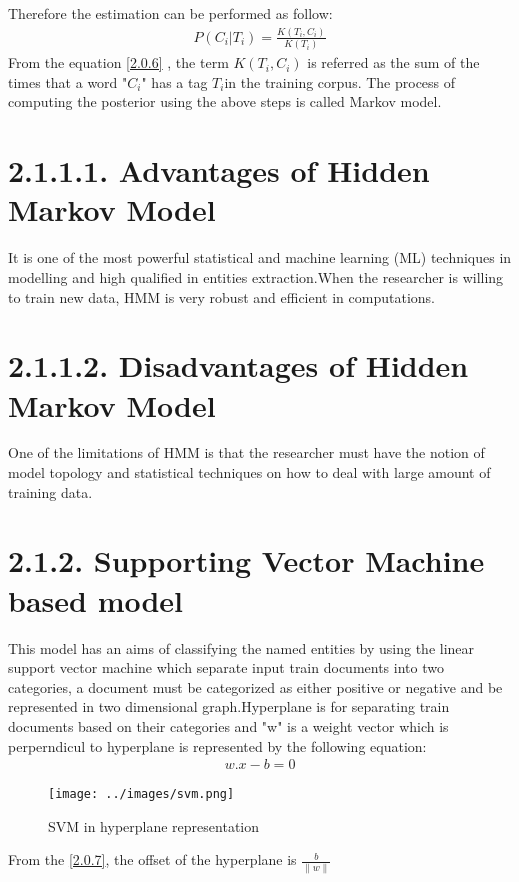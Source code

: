 Therefore the estimation can be performed as follow:
\begin{align}
P(C_{i}|T_{i}) =  \frac{K(T_{i},C_{i})}{K(T_{i})} \label{2.0.6}
\end{align}
From the equation \eqref{2.0.6} , the term $K(T_{i},C_{i})$  is referred as the sum of the times that a word "$C_{i}$" has a tag $T_{i}$in the training corpus.
The process of computing the posterior using the above steps is called Markov model.
\section*{2.1.1.1. Advantages of Hidden Markov Model}
It is one of the most powerful statistical and machine learning (ML) techniques in modelling and high qualified in entities extraction.When the researcher is willing to train new data, HMM is very robust and efficient in computations.
\section*{2.1.1.2. Disadvantages of Hidden Markov Model}
One of the limitations of HMM is that the researcher must have the notion of model topology and statistical techniques on how to deal with large amount of training data.
\section*{2.1.2.  Supporting Vector Machine based model}
This model has an aims of classifying the named entities by using the linear support vector machine which separate input train documents into two categories, a document must be categorized as either positive or negative and be represented in two dimensional graph.Hyperplane is for separating train documents based on their categories and "w" is a weight vector  which is perperndicul to hyperplane is represented by the following equation: 
\begin{align}
w.x- b = 0 \label{2.0.7}
\end{align}
\begin{figure}[hbtp]
\caption{SVM in hyperplane representation}
\centering
\texttt{[image: ../images/svm.png]}
\end{figure}

From the \eqref{2.0.7}, the offset of the hyperplane is $ \frac{b}{\parallel  w \parallel} $

